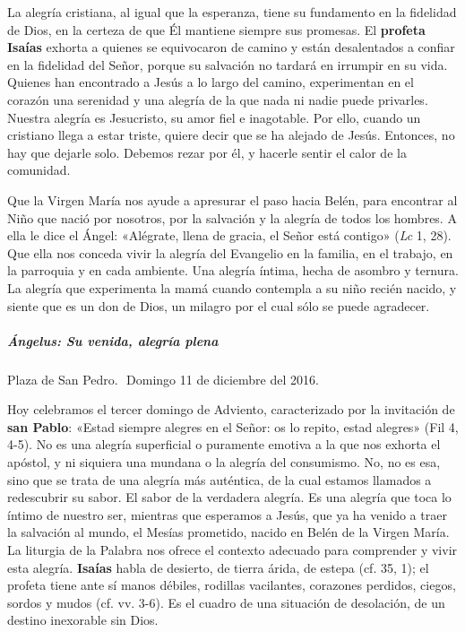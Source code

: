 \documentclass[]{article}
\let\oldsubparagraph\subparagraph
\renewcommand{\subparagraph}[1]{\oldsubparagraph{#1}\mbox{}}
\begin{document}
La alegría cristiana, al igual que la esperanza, tiene su fundamento en
la fidelidad de Dios, en la certeza de que Él mantiene siempre sus
promesas. El \textbf{profeta Isaías} exhorta a quienes se equivocaron de
camino y están desalentados a confiar en la fidelidad del Señor, porque
su salvación no tardará en irrumpir en su vida. Quienes han encontrado a
Jesús a lo largo del camino, experimentan en el corazón una serenidad y
una alegría de la que nada ni nadie puede privarles. Nuestra alegría es
Jesucristo, su amor fiel e inagotable. Por ello, cuando un cristiano
llega a estar triste, quiere decir que se ha alejado de Jesús. Entonces,
no hay que dejarle solo. Debemos rezar por él, y hacerle sentir el calor
de la comunidad.

Que la Virgen María nos ayude a apresurar el paso hacia Belén, para
encontrar al Niño que nació por nosotros, por la salvación y la alegría
de todos los hombres. A ella le dice el Ángel: «Alégrate, llena de
gracia, el Señor está contigo» (\emph{Lc} 1, 28). Que ella nos conceda
vivir la alegría del Evangelio en la familia, en el trabajo, en la
parroquia y en cada ambiente. Una alegría íntima, hecha de asombro y
ternura. La alegría que experimenta la mamá cuando contempla a su niño
recién nacido, y siente que es un don de Dios, un milagro por el cual
sólo se puede agradecer.

\subparagraph{Ángelus: Su venida, alegría
plena}\label{uxe1ngelus-su-venida-alegruxeda-plena}

Plaza de San Pedro.  Domingo 11 de diciembre del 2016.

Hoy celebramos el tercer domingo de Adviento, caracterizado por la
invitación de \textbf{san Pablo}: «Estad siempre alegres en el Señor: os
lo repito, estad alegres» (Fil 4, 4-5). No es una alegría superficial o
puramente emotiva a la que nos exhorta el apóstol, y ni siquiera una
mundana o la alegría del consumismo. No, no es esa, sino que se trata de
una alegría más auténtica, de la cual estamos llamados a redescubrir su
sabor. El sabor de la verdadera alegría. Es una alegría que toca lo
íntimo de nuestro ser, mientras que esperamos a Jesús, que ya ha venido
a traer la salvación al mundo, el Mesías prometido, nacido en Belén de
la Virgen María. La liturgia de la Palabra nos ofrece el contexto
adecuado para comprender y vivir esta alegría. \textbf{Isaías} habla de
desierto, de tierra árida, de estepa (cf. 35, 1); el profeta tiene ante
sí manos débiles, rodillas vacilantes, corazones perdidos, ciegos,
sordos y mudos (cf. vv. 3-6). Es el cuadro de una situación de
desolación, de un destino inexorable sin Dios.
\end{document}
